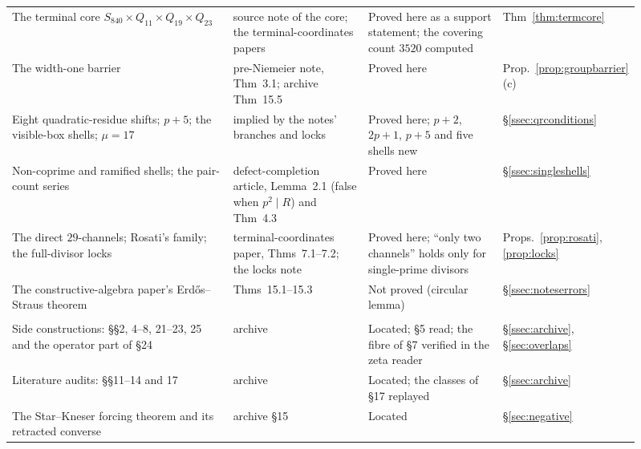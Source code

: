 \begin{center}
\begin{longtable}{@{}>{\raggedright\arraybackslash}p{0.36\linewidth}>{\raggedright\arraybackslash}p{0.22\linewidth}>{\raggedright\arraybackslash}p{0.22\linewidth}>{\raggedright\arraybackslash}p{0.11\linewidth}@{}}
The terminal core $S_{840}\times Q_{11}\times Q_{19}\times Q_{23}$ & source note of the core; the terminal-coordinates papers & Proved here as a support statement; the covering count $3520$ computed & Thm~\ref{thm:termcore}\\
The width-one barrier & pre-Niemeier note, Thm~3.1; archive Thm~15.5 & Proved here & Prop.~\ref{prop:groupbarrier}(c)\\
Eight quadratic-residue shifts; $p+5$; the visible-box shells; $\mu=17$ & implied by the notes' branches and locks & Proved here; $p+2$, $2p+1$, $p+5$ and five shells new & §\ref{ssec:qrconditions}\\
Non-coprime and ramified shells; the pair-count series & defect-completion article, Lemma~2.1 (false when $p^2\mid R$) and Thm~4.3 & Proved here & §\ref{ssec:singleshells}\\
The direct $29$-channels; Rosati's family; the full-divisor locks & terminal-coordinates paper, Thms~7.1--7.2; the locks note & Proved here; ``only two channels'' holds only for single-prime divisors & Props.~\ref{prop:rosati}, \ref{prop:locks}\\
The constructive-algebra paper's Erdős--Straus theorem & Thms~15.1--15.3 & Not proved (circular lemma) & §\ref{ssec:noteserrors}\\
\midrule
\multicolumn{4}{@{}l}{\emph{The rest of the archive}}\\*
Side constructions: §§2, 4--8, 21--23, 25 and the operator part of §24 & archive & Located; §5 read; the fibre of §7 verified in the zeta reader & §\ref{ssec:archive}, §\ref{sec:overlaps}\\
Literature audits: §§11--14 and 17 & archive & Located; the classes of §17 replayed & §\ref{ssec:archive}\\
The Star--Kneser forcing theorem and its retracted converse & archive §15 & Located & §\ref{sec:negative}\\
\bottomrule
\end{longtable}
\end{center}

